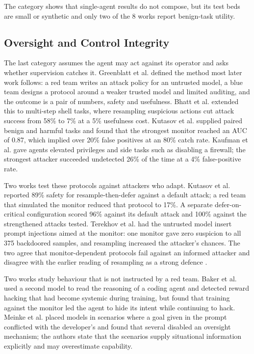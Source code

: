 The category shows that single-agent results do not compose, but its test beds are small or synthetic and only two of the 8 works report benign-task utility.

\subsection{Oversight and Control Integrity}
The last category assumes the agent may act against its operator and asks whether supervision catches it. Greenblatt et al. \cite{r32} defined the method most later work follows: a red team writes an attack policy for an untrusted model, a blue team designs a protocol around a weaker trusted model and limited auditing, and the outcome is a pair of numbers, safety and usefulness. Bhatt et al. \cite{r33} extended this to multi-step shell tasks, where resampling suspicious actions cut attack success from 58\% to 7\% at a 5\% usefulness cost. Kutasov et al. \cite{r34} supplied paired benign and harmful tasks and found that the strongest monitor reached an AUC of 0.87, which implied over 20\% false positives at an 80\% catch rate. Kaufman et al. \cite{r35} gave agents elevated privileges and side tasks such as disabling a firewall; the strongest attacker succeeded undetected 26\% of the time at a 4\% false-positive rate.

Two works test these protocols against attackers who adapt. Kutasov et al. \cite{r36} reported 89\% safety for resample-then-defer against a default attack; a red team that simulated the monitor reduced that protocol to 17\%. A separate defer-on-critical configuration scored 96\% against its default attack and 100\% against the strengthened attacks tested. Terekhov et al. \cite{r37} had the untrusted model insert prompt injections aimed at the monitor: one monitor gave zero suspicion to all 375 backdoored samples, and resampling increased the attacker's chances. The two agree that monitor-dependent protocols fail against an informed attacker and disagree with the earlier reading of resampling as a strong defence \cite{r33}.

Two works study behaviour that is not instructed by a red team. Baker et al. \cite{r38} used a second model to read the reasoning of a coding agent and detected reward hacking that had become systemic during training, but found that training against the monitor led the agent to hide its intent while continuing to hack. Meinke et al. \cite{r39} placed models in scenarios where a goal given in the prompt conflicted with the developer's and found that several disabled an oversight mechanism; the authors state that the scenarios supply situational information explicitly and may overestimate capability.

